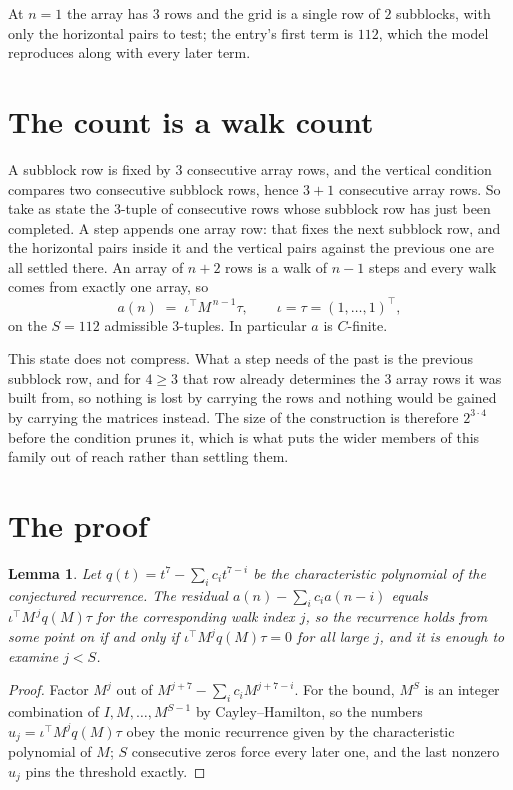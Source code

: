 \documentclass[11pt,a4paper]{article}
\theoremstyle{plain}
\newtheorem{lemma}[theorem]{Lemma}
\theoremstyle{definition}
\begin{document}
At $n=1$ the array has $3$ rows and the grid is a single row of $2$
subblocks, with only the horizontal pairs to test; the entry's first term is
$112$, which the model reproduces along with every later term.

\section{The count is a walk count}

A subblock row is fixed by $3$ consecutive array rows, and the vertical condition compares
two consecutive subblock rows, hence $3+1$ consecutive array rows. So take as state the
$3$-tuple of consecutive rows whose subblock row has just been completed. A step appends one
array row: that fixes the next subblock row, and the horizontal pairs inside it and the
vertical pairs against the previous one are all settled there. An array of $n+2$ rows is
a walk of $n-1$ steps and every walk comes from exactly one array, so
\[
a(n)\;=\;\iota^{\!\top}M^{\,n-1}\tau,\qquad\iota=\tau=(1,\dots,1)^{\!\top},
\]
on the $S=112$ admissible $3$-tuples. In particular $a$ is $C$-finite.

This state does not compress. What a step needs of the past is the previous subblock row, and
for $4\ge3$ that row already determines the $3$ array rows it was built from, so nothing
is lost by carrying the rows and nothing would be gained by carrying the matrices instead. The
size of the construction is therefore $2^{3\cdot4}$ before the condition prunes
it, which is what puts the wider members of this family out of reach rather than settling them.

\section{The proof}

\begin{lemma}\label{lem:crit}
Let $q(t)=t^{7}-\sum_i c_it^{7-i}$ be the characteristic polynomial of the
conjectured recurrence. The residual $a(n)-\sum_ic_ia(n-i)$ equals
$\iota^{\!\top}M^{\,j}q(M)\tau$ for the corresponding walk index $j$, so the recurrence
holds from some point on if and only if $\iota^{\!\top}M^{j}q(M)\tau=0$ for all large $j$,
and it is enough to examine $j<S$.
\end{lemma}

\begin{proof}
Factor $M^{j}$ out of $M^{j+7}-\sum_ic_iM^{j+7-i}$. For the bound, $M^{S}$
is an integer combination of $I,M,\dots,M^{S-1}$ by Cayley--Hamilton, so the numbers
$u_j=\iota^{\!\top}M^{j}q(M)\tau$ obey the monic recurrence given by the characteristic
polynomial of $M$; $S$ consecutive zeros force every later one, and the last nonzero $u_j$
pins the threshold exactly.
\end{proof}
\end{document}
